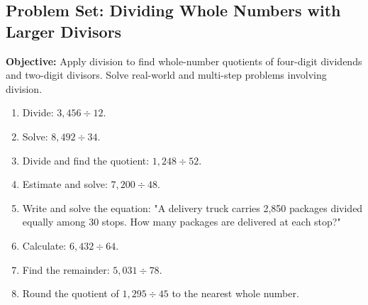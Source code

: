 \documentclass[12pt]{article}
\title{}
\date{}
\begin{document}
\subsection*{Problem Set: Dividing Whole Numbers with Larger Divisors}
\onehalfspacing

\begin{tcolorbox}[colframe=black!40, colback=gray!5, 
coltitle=black, colbacktitle=black!20, fonttitle=\bfseries\Large, 
title=Learning Objective, halign title=center, left=5pt, right=5pt, top=5pt, bottom=15pt]
\textbf{Objective:} Apply division to find whole-number quotients of four-digit dividends and two-digit divisors. Solve real-world and multi-step problems involving division.
\end{tcolorbox}

\begin{tcolorbox}[colframe=black!60, colback=white, 
coltitle=black, colbacktitle=black!15, fonttitle=\bfseries\Large, 
title=Exercises, halign title=center, left=10pt, right=10pt, top=10pt, bottom=60pt]
\begin{enumerate}[itemsep=4em]
    \item Divide: \( 3,456 \div 12 \).
    \item Solve: \( 8,492 \div 34 \).
    \item Divide and find the quotient: \( 1,248 \div 52 \).
    \item Estimate and solve: \( 7,200 \div 48 \).
    \item Write and solve the equation: "A delivery truck carries 2,850 packages divided equally among 30 stops. How many packages are delivered at each stop?"
    \item Calculate: \( 6,432 \div 64 \).
    \item Find the remainder: \( 5,031 \div 78 \).
    \item Round the quotient of \( 1,295 \div 45 \) to the nearest whole number.
    \vspace{2cm}
\end{enumerate}
\end{tcolorbox}

\vspace{1em}
\end{document}
